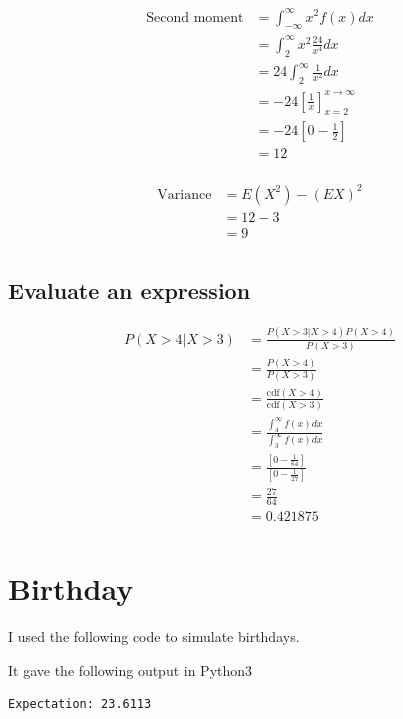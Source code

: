 \documentclass{article}
\begin{document}
\begin{align*}
    \text{Second moment} &= \int_{-\infty}^{\infty} x^2 f(x) dx \\
    &= \int_{2}^{\infty} x^2 \frac{24}{x^4} dx \\
    &= 24 \int_{2}^{\infty} \frac{1}{x^2} dx \\
    &= -24 \left[ \frac{1}{x} \right]_{x=2}^{x\to\infty} \\
    &= -24 \left[ 0 - \frac{1}{2} \right] \\
    &= 12 \\
\end{align*}

\begin{align*}
    \text{Variance} &= E(X^2) - (EX)^2 \\
    &= 12 - 3 \\
    &= 9 \\
\end{align*}

\subsection{Evaluate an expression}
\begin{align*}
    P(X > 4 | X > 3) &= \frac{P(X > 3 | X > 4)P(X > 4)}{P(X > 3)} \\
    &= \frac{P(X > 4)}{P(X > 3)} \\
    &= \frac{\text{cdf}(X > 4)}{\text{cdf}(X > 3)} \\
    &= \frac{\int_{4}^\infty f(x) dx}{\int_{3}^\infty f(x) dx} \\
    &= \frac{\left[ 0 - \frac{1}{64} \right]}{\left[ 0 - \frac{1}{27} \right]} \\
    &= \frac{27}{64} \\
    &= 0.421875 \\
\end{align*}

\section{Birthday}
I used the following code to simulate birthdays.


It gave the following output in Python3
\begin{verbatim}
Expectation: 23.6113
\end{verbatim}
\end{document}
